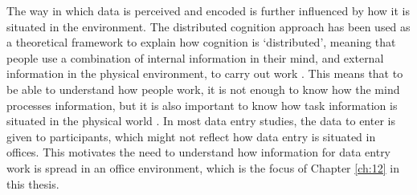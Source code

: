 The way in which data is perceived and encoded is further influenced by how it is situated in the environment. The distributed cognition approach has been used as a theoretical framework to explain how cognition is ‘distributed’, meaning that people use a combination of internal information in their mind, and external information in the physical environment, to carry out work \citep{Hollan2000, Hutchins1995}. This means that to be able to understand how people work, it is not enough to know how the mind processes information, but it is also important to know how task information is situated in the physical world \citep{Hollan2000}. In most data entry studies, the data to enter is given to participants, which might not reflect how data entry is situated in offices. This motivates the need to understand how information for data entry work is spread in an office environment, which is the focus of Chapter \ref{ch:12} in this thesis. 


